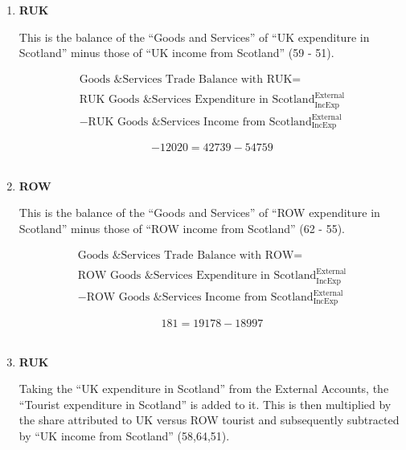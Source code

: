\begin{enumerate}
\item \textbf {RUK}

This is the balance of the ``Goods and Services'' of ``UK expenditure in Scotland'' minus those of ``UK income from Scotland'' (59 - 51).

\begin{equation}
\begin{split}
\text{Goods \& Services Trade Balance with RUK} =  \\ \\ 
\text{RUK Goods \& Services Expenditure in Scotland}^\text{External}_\text{IncExp}\\
-\text{RUK Goods \& Services Income from Scotland}^\text{External}_\text{IncExp}
\end{split} \label{eq:2.5.71}
\end{equation}

\begin{equation} \nonumber
-12020 = 42739-54759
\end{equation}\\


\item \textbf {ROW}

This is the balance of the ``Goods and Services'' of ``ROW expenditure in Scotland'' minus those of ``ROW income from Scotland'' (62 - 55).

\begin{equation}
\begin{split}
\text{Goods \& Services Trade Balance with ROW} =  \\ \\ 
\text{ROW Goods \& Services Expenditure in Scotland}^\text{External}_\text{IncExp}\\
-\text{ROW Goods \& Services Income from Scotland}^\text{External}_\text{IncExp}
\end{split} \label{eq:2.5.72}
\end{equation}

\begin{equation} \nonumber
181 = 19178-18997
\end{equation}\\



\pagebreak

\item \textbf {RUK}

Taking the ``UK expenditure in Scotland'' from the External Accounts, the ``Tourist expenditure in Scotland'' is added to it. This is then multiplied by the share attributed to UK versus ROW tourist and subsequently subtracted by ``UK income from Scotland'' (58,64,51).  \cite{ONS2010a}\\


\end{enumerate}
